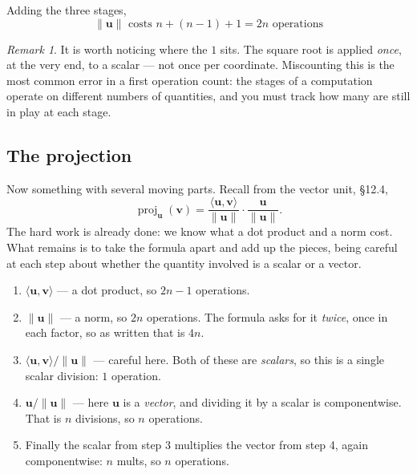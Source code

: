 \documentclass[11pt]{article}
\theoremstyle{plain}
\theoremstyle{definition}
\theoremstyle{remark}
\newtheorem*{rmk}{Remark}
\newcommand{\vc}[1]{\mathbf{#1}}
\newcommand{\norm}[1]{\lVert #1\rVert}
\newcommand{\proj}[2]{\operatorname{proj}_{#1}(#2)}
\begin{document}
\noindent Adding the three stages,
\[
  \boxed{\,\norm{\vc{u}} \text{ costs } n + (n-1) + 1 = 2n
          \text{ operations}\,}
\]

\begin{rmk}
It is worth noticing where the $1$ sits. The square root is applied \emph{once},
at the very end, to a scalar --- not once per coordinate. Miscounting this is
the most common error in a first operation count: the stages of a computation
operate on different numbers of quantities, and you must track how many are
still in play at each stage.
\end{rmk}

\subsection{The projection}
Now something with several moving parts. Recall from the vector unit, \S12.4,
\[
  \proj{\vc{u}}{\vc{v}}
  = \frac{\langle\vc{u},\vc{v}\rangle}{\norm{\vc{u}}}\cdot
    \frac{\vc{u}}{\norm{\vc{u}}} .
\]
The hard work is already done: we know what a dot product and a norm cost. What
remains is to take the formula apart and add up the pieces, being careful at
each step about whether the quantity involved is a scalar or a vector.

\begin{enumerate}[label=\textbf{\arabic*.},leftmargin=2.4em,itemsep=4pt,
                  topsep=4pt]
  \item $\langle\vc{u},\vc{v}\rangle$ --- a dot product, so $2n-1$ operations.
  \item $\norm{\vc{u}}$ --- a norm, so $2n$ operations. The formula asks for it
        \emph{twice}, once in each factor, so as written that is $4n$.
  \item $\langle\vc{u},\vc{v}\rangle/\norm{\vc{u}}$ --- careful here. Both of
        these are \emph{scalars}, so this is a single scalar division:
        $1$ operation.
  \item $\vc{u}/\norm{\vc{u}}$ --- here $\vc{u}$ is a \emph{vector}, and
        dividing it by a scalar is componentwise. That is $n$ divisions, so $n$
        operations.
  \item Finally the scalar from step 3 multiplies the vector from step 4, again
        componentwise: $n$ mults, so $n$ operations.
\end{enumerate}
\end{document}
